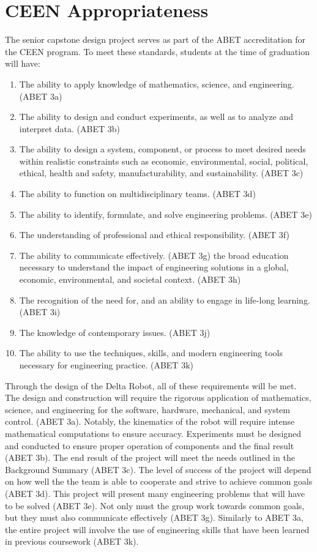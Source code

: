 \documentclass[11pt]{report}
\begin{document}
\section{CEEN Appropriateness}
The senior capstone design project serves as part of the ABET accreditation for the CEEN program.
To meet these standards, students at the time of graduation will have:
\begin{enumerate} \parskip2pt
	\item The ability to apply knowledge of mathematics, science, and engineering. (ABET 3a)
	\item The ability to design and conduct experiments, as well as to analyze and interpret data. (ABET 3b)
	\item The ability to design a system, component, or process to meet desired needs within realistic constraints such as economic, environmental, social, political, ethical, health and safety, manufacturability, and sustainability. (ABET 3c)
	\item The ability to function on multidisciplinary teams. (ABET \gls{3d})
	\item The ability to identify, formulate, and solve engineering problems. (ABET 3e)
	\item The understanding of professional and ethical responsibility. (ABET 3f)
	\item The ability to communicate effectively. (ABET 3g)
the broad education necessary to understand the impact of engineering solutions in a global, economic, environmental, and societal context. (ABET 3h)
	\item The recognition of the need for, and an ability to engage in life-long learning. (ABET 3i)
	\item The knowledge of contemporary issues. (ABET 3j)
	\item The ability to use the techniques, skills, and modern engineering tools necessary for engineering practice. (ABET 3k)
\end{enumerate}

Through the design of the Delta Robot, all of these requirements will be met.
The design and construction will require the rigorous application of mathematics, science, and engineering for the software, hardware, mechanical, and system control. (ABET 3a).
Notably, the kinematics of the robot will require intense mathematical computations to ensure accuracy.
Experiments must be designed and conducted to ensure proper operation of components and the final result (ABET 3b).
The end result of the project will meet the needs outlined in the Background Summary (ABET 3c).
The level of success of the project will depend on how well the the team is able to cooperate and strive to achieve common goals (ABET \gls{3d}).
This project will present many engineering problems that will have to be solved (ABET 3e).
Not only must the group work towards common goals, but they must also communicate effectively (ABET 3g).
Similarly to ABET 3a, the entire project will involve the use of engineering skills that have been learned in previous coursework (ABET 3k).
\end{document}
